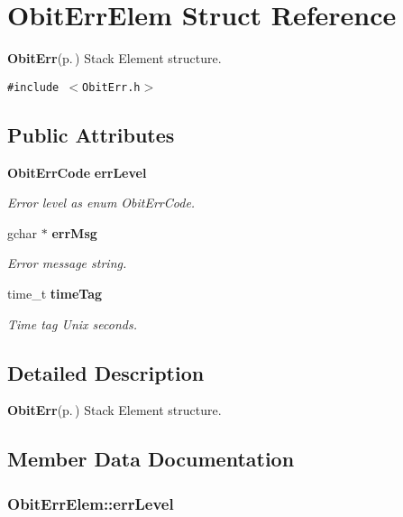 \section{Obit\-Err\-Elem Struct Reference}
\label{structObitErrElem}
{\bf Obit\-Err}{\rm (p.\,\pageref{structObitErr})} Stack Element structure.  


{\tt \#include $<$Obit\-Err.h$>$}

\subsection*{Public Attributes}
\begin{CompactItemize}
\item 
{\bf Obit\-Err\-Code} {\bf err\-Level}
\begin{CompactList}\small\item\em Error level as enum Obit\-Err\-Code. \item\end{CompactList}\item 
gchar $\ast$ {\bf err\-Msg}
\begin{CompactList}\small\item\em Error message string. \item\end{CompactList}\item 
time\_\-t {\bf time\-Tag}
\begin{CompactList}\small\item\em Time tag Unix seconds. \item\end{CompactList}\end{CompactItemize}


\subsection{Detailed Description}
{\bf Obit\-Err}{\rm (p.\,\pageref{structObitErr})} Stack Element structure. 



\subsection{Member Data Documentation}
\subsubsection{ {\bf Obit\-Err\-Elem::err\-Level}}\label{structObitErrElem_o0}


